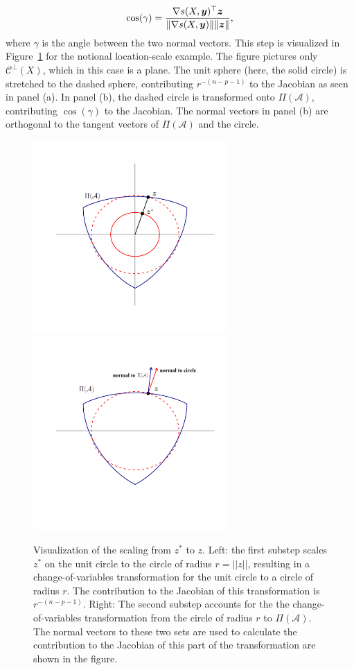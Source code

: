 \documentclass[ba]{imsart}
\newcommand{\by}{\mbox{\boldmath $y$}}
\newcommand{\bz}{\mbox{\boldmath $z$}}
\newcommand{\mc}{\mathcal}
\begin{document}
\begin{equation}
\label{cosine}
\cos(\gamma)=\frac{\nabla s(X,\by)^\top \bz}{\|\nabla
s(X,\by)\| \|\bz\|},
\end{equation}
where $\gamma$ is the angle between the two normal vectors.
This step is visualized in Figure~\ref{fig:stretchDeform} for the notional
location-scale example.  The figure pictures only $\mathcal{C}^{\perp}(X)$,
which in this case is a plane. The unit sphere (here, the
solid circle) is stretched to the dashed sphere, contributing
$r^{-(n-p-1)}$ to the Jacobian as seen in panel (a). In panel (b), the
dashed circle is transformed onto $\Pi(\mc A)$, contributing
$\cos(\gamma)$ to the Jacobian. The normal vectors in panel (b) are
orthogonal to the tangent vectors of $\Pi(\mc A)$ and the circle. 

\begin{figure}[t]
\centering
{\includegraphics[width=2.9in]{minSSZSpace3.pdf}}
{\includegraphics[width=2.9in]{minSSZSpace5.pdf}}
\caption{Visualization of the scaling from $z^{*}$ to $z$. Left: the first substep scales $z^{*}$ on the unit circle to the circle of radius $r = ||z||$, resulting in a change-of-variables transformation for the unit circle to a circle of radius $r$. The contribution to the Jacobian of this transformation is $r^{-(n-p-1)}$. Right: The second substep accounts for the the change-of-variables transformation from the circle of radius $r$ to $\Pi(\mathcal{A})$. The normal vectors to these two sets are used to calculate the contribution to the Jacobian of this part of the transformation are shown in the figure.}
\label{fig:stretchDeform}
\end{figure}
\end{document}
